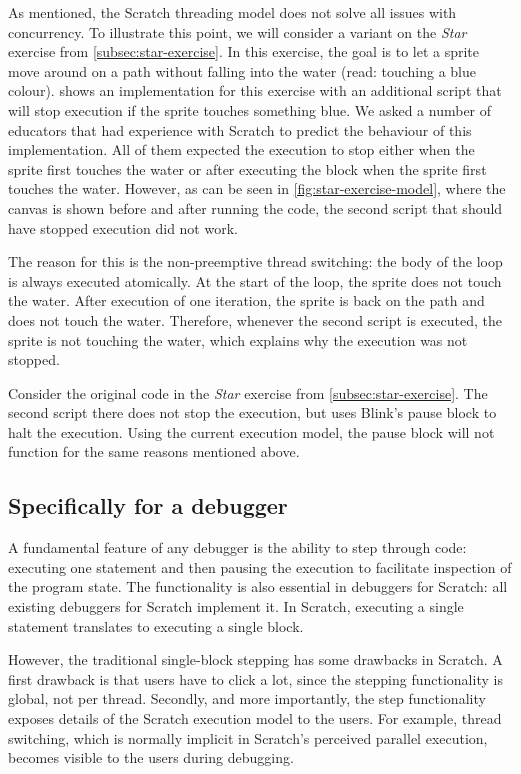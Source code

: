 \documentclass[../main]{subfiles}
\begin{document}
As \textcite{maloneyScratchProgrammingLanguage2010} mentioned, the Scratch threading model does not solve all issues with concurrency.
To illustrate this point, we will consider a variant on the \emph{Star} exercise from \cref{subsec:star-exercise}.
In this exercise, the goal is to let a sprite move around on a path without falling into the water (read: touching a blue colour).
 shows an implementation for this exercise with an additional script that will stop execution if the sprite touches something blue.
We asked a number of educators that had experience with Scratch to predict the behaviour of this implementation.
All of them expected the execution to stop either when the sprite first touches the water or after executing the block when the sprite first touches the water.
However, as can be seen in \cref{fig:star-exercise-model}, where the canvas is shown before and after running the code, the second script that should have stopped execution did not work.

The reason for this is the non-preemptive thread switching: the body of the loop is always executed atomically.
At the start of the loop, the sprite does not touch the water.
After execution of one iteration, the sprite is back on the path and does not touch the water.
Therefore, whenever the second script is executed, the sprite is not touching the water, which explains why the execution was not stopped.

Consider the original code in the \emph{Star} exercise from \cref{subsec:star-exercise}.
The second script there does not stop the execution, but uses Blink's pause block to halt the execution.
Using the current execution model, the pause block will not function for the same reasons mentioned above.

\subsection{Specifically for a debugger}\label{subsec:specifically-for-a-debugger}

A fundamental feature of any debugger is the ability to step through code: executing one statement and then pausing the execution to facilitate inspection of the program state.
The functionality is also essential in debuggers for Scratch: all existing debuggers for Scratch implement it.
In Scratch, executing a single statement translates to executing a single block.

However, the traditional single-block stepping has some drawbacks in Scratch.
A first drawback is that users have to click a lot, since the stepping functionality is global, not per thread.
Secondly, and more importantly, the step functionality exposes details of the Scratch execution model to the users.
For example, thread switching, which is normally implicit in Scratch's perceived parallel execution, becomes visible to the users during debugging.
\end{document}
